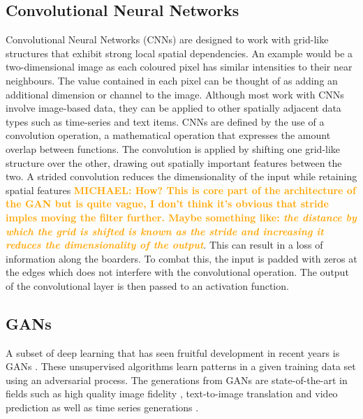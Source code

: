 \documentclass[12pt]{iopart}
\newcommand{\michael}[1]{\textbf{\textcolor{orange}{MICHAEL: #1}}}
\begin{document}
\subsection{Convolutional Neural Networks}
Convolutional Neural Networks (CNNs) are designed to work with grid-like structures that exhibit strong local spatial dependencies. An example would be a two-dimensional image as each coloured pixel has similar intensities to their near neighbours. The value contained in each pixel can be thought of as adding an additional dimension or channel to the image. Although most work with CNNs involve image-based data, they can be applied to other spatially adjacent data types such as time-series and
text items. CNNs are defined by the use of a convolution operation, a mathematical operation that expresses the amount overlap between functions. The convolution is applied by shifting one grid-like structure over the other, drawing out spatially important features between the two.  A strided convolution reduces the dimensionality of the input while retaining spatial features \michael{How? This is core part of the architecture of the GAN but is quite vague, I don't think it's
obvious that stride imples moving the filter further. Maybe something like: \textit{the distance by which the grid is shifted is known as the stride and increasing it reduces the dimensionality of the output}}. This can result in a loss of information along the boarders. To combat this, the input is padded with zeros at the edges which does not interfere with the convolutional operation. The output of the convolutional layer is then passed to an activation function. 

\subsection{GANs}

A subset of deep learning that has seen fruitful development in recent years is \acp{GAN} \cite{Goodfellow2014}. These unsupervised algorithms learn
patterns in a given training data set using an adversarial process. The
generations from \acp{GAN} are state-of-the-art in fields such as high quality image
fidelity \cite{brock2018large,karras2019analyzing}, text-to-image translation
\cite{reed2016generative} and video prediction \cite{liang2017dual} as well as
time series generations \cite{esteban2017realvalued}. 
\end{document}
